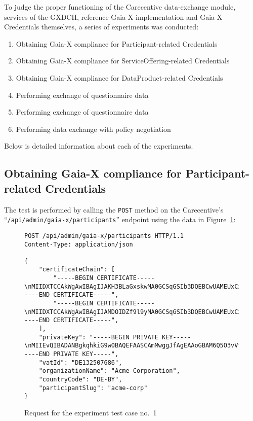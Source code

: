 To judge the proper functioning of the Carecentive data-exchange module, services of the GXDCH, reference Gaia-X implementation and Gaia-X Credentials themselves, a series of experiments was conducted:
\begin{enumerate}
    \item Obtaining Gaia-X compliance for Participant-related Credentials
    \item Obtaining Gaia-X compliance for ServiceOffering-related Credentials
    \item Obtaining Gaia-X compliance for DataProduct-related Credentials
    \item Performing exchange of questionnaire data
    \item Performing exchange of questionnaire data
    \item Performing data exchange with policy negotiation
\end{enumerate}

Below is detailed information about each of the experiments.

\subsection{Obtaining Gaia-X compliance for Participant-related Credentials}\label{subsec:participant-compliance}

The test is performed by calling the \texttt{POST} method on the Carecentive's ``\texttt{/api/admin/gaia-x/participants}'' endpoint using the data in Figure~\ref{fig:test_case_1}:

\begin{figure}[h]
    \centering
    \begin{verbatim}
POST /api/admin/gaia-x/participants HTTP/1.1
Content-Type: application/json

{
	"certificateChain": [
		"-----BEGIN CERTIFICATE-----\nMIIDXTCCAkWgAwIBAgIJAKH3BLaGxskwMA0GCSqGSIb3DQEBCwUAMEUxCzAJBgNV\n...\nJmCVzwB/MCuv3z4IV0IsbP5ZKh+6m0oI+RINdDl4Stxdj6LK8JspNeU0R6mBg1A=\n-----END CERTIFICATE-----",
		"-----BEGIN CERTIFICATE-----\nMIIDXTCCAkWgAwIBAgIJAMDOIDZf9l9yMA0GCSqGSIb3DQEBCwUAMEUxCzAJBgNV\n...\nv5pXVIlZm8DtRmDTUp8pNDnQ5UAZTuDPaWo3zbxZPOUmGJ1IlBOgaQvsyPCW5gU=\n-----END CERTIFICATE-----",
	],
	"privateKey": "-----BEGIN PRIVATE KEY-----\nMIIEvQIBADANBgkqhkiG9w0BAQEFAASCAmMwggJfAgEAAoGBAM6Q5O3vVfnxk6P7\n...\nYWw+HiFJh9XQpRUtv9PV8L8AqFFfMdsOpT6pgC+aA/WB\n-----END PRIVATE KEY-----",
	"vatId": "DE132507686",
	"organizationName": "Acme Corporation",
	"countryCode": "DE-BY",
	"participantSlug": "acme-corp"
}
    \end{verbatim}
    \caption{Request for the experiment test case no.~1}\label{fig:test_case_1}
\end{figure}

